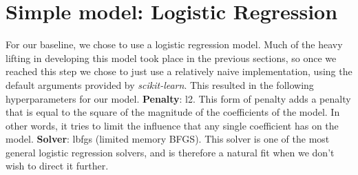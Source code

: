 \section{Simple model: Logistic Regression} 
For our baseline, we chose to use a logistic regression model. Much of the heavy lifting in developing this model took place in the previous sections,
so once we reached this step we chose to just use a relatively naive implementation, using the default arguments provided
by \textit{scikit-learn}. This resulted in the following hyperparameters for our model. \textbf{Penalty}: l2. This form of penalty adds a penalty that is equal to the square of the magnitude of the
    coefficients of the model. In other words, it tries to limit the influence that any single coefficient has on the
    model. \textbf{Solver}: lbfgs (limited memory BFGS). This solver is one of the most general logistic regression
    solvers, and is therefore a natural fit when we don't wish to direct it further.
